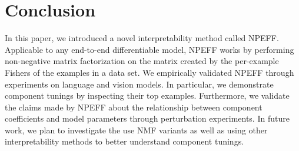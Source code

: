 \documentclass[dvipsnames]{article}
\begin{document}






\section{Conclusion}
In this paper, we introduced a novel interpretability method called NPEFF.
Applicable to any end-to-end differentiable model, NPEFF works by performing non-negative matrix factorization on the matrix created by the per-example Fishers of the examples in a data set.
We empirically validated NPEFF through experiments on language and vision models.
In particular, we demonstrate component tunings by inspecting their top examples.
Furthermore, we validate the claims made by NPEFF about the relationship between component coefficients and model parameters through perturbation experiments.
In future work, we plan to investigate the use NMF variants as well as using other interpretability methods to better understand component tunings.








\newpage
\appendix
\onecolumn
\end{document}
